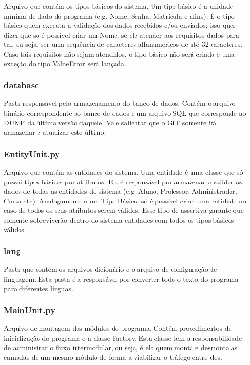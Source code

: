 Arquivo que contém os tipos básicos do sistema. Um tipo básico é a unidade mínima de dado do programa (e.\-g. Nome, Senha, Matrícula e afins). É o tipo básico quem executa a validação dos dados recebidos e/ou enviados; isso quer dizer que só é possível criar um Nome, se ele atender aos requisitos dados para tal, ou seja, ser uma sequência de caracteres alfanuméricos de até 32 caracteres. Caso tais requisitos não sejam atendidos, o tipo básico não será criado e uma exceção do tipo Value\-Error será lançada.

\subsubsection*{database}

Pasta responsável pelo armazenamento do banco de dados. Contém o arquivo binário correspondente ao banco de dados e um arquivo S\-Q\-L que corresponde ao D\-U\-M\-P da última versão daquele. Vale salientar que o G\-I\-T somente irá armazenar e atualizar este último.

\subsubsection*{\hyperlink{EntityUnit_8py}{Entity\-Unit.\-py}}

Arquivo que contém as entidades do sistema. Uma entidade é uma classe que só possui tipos básicos por atributos. Ela é responsável por armazenar a validar os dados de todas as entidades do sistema (e.\-g. Aluno, Professor, Administrador, Curso etc). Analogamente a um Tipo Básico, só é possível criar uma entidade no caso de todos os seus atributos serem válidos. Esse tipo de assertiva garante que somente sobreviverão dentro do sistema entidades com todos os tipos básicos válidos.

\subsubsection*{lang}

Pasta que contém os arquivos-\/dicionário e o arquivo de configuração de linguagem. Esta pasta é a responsável por converter todo o texto do programa para diferentes línguas.

\subsubsection*{\hyperlink{MainUnit_8py}{Main\-Unit.\-py}}

Arquivo de montagem dos módulos do programa. Contém procedimentos de inicialização do programa e a classe Factory. Esta classe tem a responsabilidade de administrar o fluxo intermodular, ou seja, é ela quem monta e desmonta as camadas de um mesmo módulo de forma a viabilizar o tráfego entre eles.

